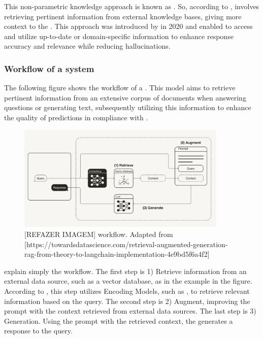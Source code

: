 This non-parametric knowledge approach is known as {\rag}. So, according to \citet{gao_retrieval-augmented_2023}, {\rag} involves retrieving pertinent information from external knowledge bases, giving more context to the {\llm}. This approach was introduced by \citet{lewis_retrieval-augmented_2020} in 2020 and enabled {\llm} to access and utilize up-to-date or domain-specific information to enhance response accuracy and relevance while reducing hallucinations.


\subsubsection{Workflow of a {\rag} system}

The following figure shows the workflow of a {\rag}. This model aims to retrieve pertinent information from an extensive corpus of documents when answering questions or generating text, subsequently utilizing this information to enhance the quality of predictions in compliance with \citet{lewis_retrieval-augmented_2020}.

\begin{figure}[ht]
    \includegraphics[width=10cm]{figs/chapter2/rag_workflow.png}
    \centering
    \caption{[REFAZER IMAGEM] {\rag} workflow. Adapted from [https://towardsdatascience.com/retrieval-augmented-generation-rag-from-theory-to-langchain-implementation-4e9bd5f6a4f2]}
\end{figure}

\citet{gao_retrieval-augmented_2023} explain simply the workflow. The first step is 1) Retrieve information from an external data source, such as a vector database, as in the example in the figure. According to \citet{gao_retrieval-augmented_2023}, this step utilizes Encoding Models, such as {\bm}, to retrieve relevant information based on the query. The second step is 2) Augment, improving the {\llm} prompt with the context retrieved from external data sources. The last step is 3) Generation. Using the prompt with the retrieved context, the {\llm} generates a response to the query.


